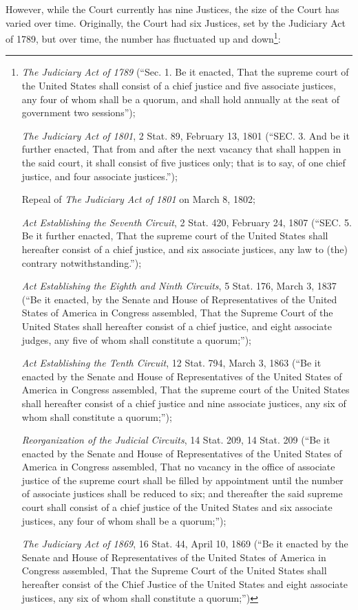 However, while the Court currently has nine Justices, the size of the Court has varied over time.  Originally, the Court had six Justices, set by the Judiciary Act of 1789, but over time, the number has fluctuated up and down\footnote{\textit{The Judiciary Act of 1789} (``Sec. 1. Be it enacted, That the supreme court of the United States shall consist of a chief justice and five associate justices, any four of whom shall be a quorum, and shall hold annually at the seat of government two sessions''); 

\textit{The Judiciary Act of 1801}, 2 Stat. 89, February 13, 1801 (``SEC. 3. And be it further enacted, That from and after the next vacancy that shall happen in the said court, it shall consist of five justices only; that is to say, of one chief justice, and four associate justices.''); 

Repeal of \textit{The Judiciary Act of 1801} on March 8, 1802; 

\textit{Act Establishing the Seventh Circuit}, 2 Stat. 420, February 24, 1807 (``SEC. 5. Be it further enacted, That the supreme court of the United States shall hereafter consist of a chief justice, and six associate justices, any law to (the) contrary notwithstanding.''); 

\textit{Act Establishing the Eighth and Ninth Circuits}, 5 Stat. 176, March 3, 1837 (``Be it enacted, by the Senate and House of Representatives of the United States of America in Congress assembled, That the Supreme Court of the United States shall hereafter consist of a chief justice, and eight associate judges, any five of whom shall constitute a quorum;''); 

\textit{Act Establishing the Tenth Circuit}, 12 Stat. 794, March 3, 1863 (``Be it enacted by the Senate and House of Representatives of the United States of America in Congress assembled, That the supreme court of the United States shall hereafter consist of a chief justice and nine associate justices, any six of whom shall constitute a quorum;'');

\textit{Reorganization of the Judicial Circuits}, 14 Stat. 209, 14 Stat. 209 (``Be it enacted by the Senate and House of Representatives of the United States of America in Congress assembled, That no vacancy in the office of associate justice of the supreme court shall be filled by appointment until the number of associate justices shall be reduced to six; and thereafter the said supreme court shall consist of a chief justice of the United States and six associate justices, any four of whom shall be a quorum;'');

\textit{The Judiciary Act of 1869}, 16 Stat. 44, April 10, 1869 (``Be it enacted by the Senate and House of Representatives of the United States of America in Congress assembled, That the Supreme Court of the United States shall hereafter consist of the Chief Justice of the United States and eight associate justices, any six of whom shall constitute a quorum;'')

}:

